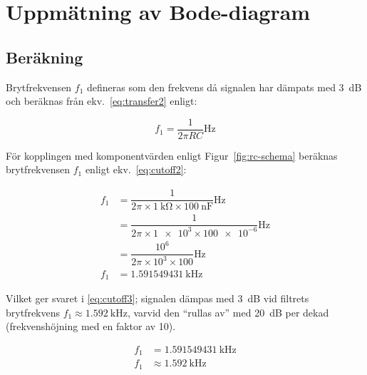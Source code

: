 %
%

\section{Uppmätning av Bode-diagram}\label{bode}
\subsection{Beräkning}
Brytfrekvensen $f_1$ defineras som den frekvens då signalen har dämpats med
\SI{3}{\dB} och beräknas från ekv.~\eqref{eq:transfer2} enligt:

\begin{equation}\label{eq:cutoff}
  f_1 = \dfrac{1}{2 \pi R C} \si{\Hz}
\end{equation}

För kopplingen med komponentvärden enligt Figur~\ref{fig:rc-schema} beräknas
brytfrekvensen $f_1$ enligt ekv.~\eqref{eq:cutoff2}:

\begin{equation}\label{eq:cutoff2}
  \begin{split}
    f_1 &= \dfrac{1}{2 \pi \times \SI{1}{\kohm} \times \SI{100}{\nano\farad}} \si{\Hz} \\
        &= \dfrac{1}{2 \pi \times \num{1e3} \times \num{100e-6}} \si{\Hz}              \\
        &= \dfrac{10^6}{2 \pi \times 10^3 \times \num{100}} \si{\Hz}                   \\
    f_1 &= \SI{1.591549431}{\kHz}
  \end{split}
\end{equation}

Vilket ger svaret i \eqref{eq:cutoff3}; signalen dämpas med \SI{3}{\dB} vid
filtrets brytfrekvens $f_1 \approx \SI{1.592}{\kHz}$, varvid den ``rullas av''
med \SI{20}{\dB} per dekad (frekvenshöjning med en faktor av 10).

\begin{equation}\label{eq:cutoff3}
  \begin{split}
    f_1 &= \SI{1.591549431}{\kHz} \\
    f_1 &\approx \SI{1.592}{\kHz} \\
  \end{split}
\end{equation}


